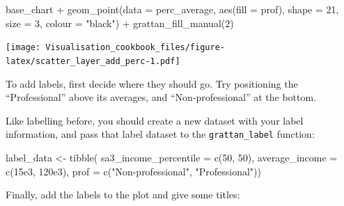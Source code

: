 \documentclass[
]{book}
\newenvironment{Shaded}{\begin{snugshade}}{\end{snugshade}}
\newcommand{\AttributeTok}[1]{\textcolor[rgb]{0.77,0.63,0.00}{#1}}
\newcommand{\DecValTok}[1]{\textcolor[rgb]{0.00,0.00,0.81}{#1}}
\newcommand{\FloatTok}[1]{\textcolor[rgb]{0.00,0.00,0.81}{#1}}
\newcommand{\FunctionTok}[1]{\textcolor[rgb]{0.00,0.00,0.00}{#1}}
\newcommand{\NormalTok}[1]{#1}
\newcommand{\OtherTok}[1]{\textcolor[rgb]{0.56,0.35,0.01}{#1}}
\newcommand{\SpecialCharTok}[1]{\textcolor[rgb]{0.00,0.00,0.00}{#1}}
\newcommand{\StringTok}[1]{\textcolor[rgb]{0.31,0.60,0.02}{#1}}
\begin{document}
\begin{Shaded}
\begin{Highlighting}[]
\NormalTok{base\_chart }\SpecialCharTok{+}
  \FunctionTok{geom\_point}\NormalTok{(}\AttributeTok{data =}\NormalTok{ perc\_average,}
             \FunctionTok{aes}\NormalTok{(}\AttributeTok{fill =}\NormalTok{ prof),}
             \AttributeTok{shape =} \DecValTok{21}\NormalTok{,}
             \AttributeTok{size =} \DecValTok{3}\NormalTok{, }
             \AttributeTok{colour =} \StringTok{"black"}\NormalTok{) }\SpecialCharTok{+} 
  \FunctionTok{grattan\_fill\_manual}\NormalTok{(}\DecValTok{2}\NormalTok{)}
\end{Highlighting}
\end{Shaded}

\texttt{[image: Visualisation\_cookbook\_files/figure-latex/scatter\_layer\_add\_perc-1.pdf]}

To add labels, first decide where they should go. Try positioning the ``Professional'' above its averages, and ``Non-professional'' at the bottom.

Like labelling before, you should create a new dataset with your label information, and pass that label dataset to the \texttt{grattan\_label} function:

\begin{Shaded}
\begin{Highlighting}[]
\NormalTok{label\_data }\OtherTok{\textless{}{-}} \FunctionTok{tibble}\NormalTok{(}
  \AttributeTok{sa3\_income\_percentile =} \FunctionTok{c}\NormalTok{(}\DecValTok{50}\NormalTok{, }\DecValTok{50}\NormalTok{),}
  \AttributeTok{average\_income =} \FunctionTok{c}\NormalTok{(}\FloatTok{15e3}\NormalTok{, }\FloatTok{120e3}\NormalTok{),}
  \AttributeTok{prof =}  \FunctionTok{c}\NormalTok{(}\StringTok{"Non{-}professional"}\NormalTok{, }\StringTok{"Professional"}\NormalTok{))}
\end{Highlighting}
\end{Shaded}

Finally, add the labels to the plot and give some titles:
\end{document}
